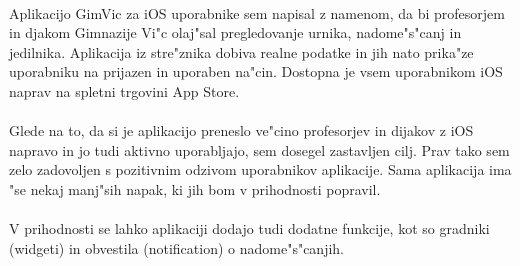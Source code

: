 \paragraph{}Aplikacijo GimVic za iOS uporabnike sem napisal z namenom, da bi profesorjem in djakom Gimnazije Vi"c olaj"sal pregledovanje urnika, nadome"s"canj in jedilnika. Aplikacija iz stre"znika dobiva realne podatke in jih nato prika"ze uporabniku na prijazen in uporaben na"cin. Dostopna je vsem uporabnikom iOS naprav na spletni trgovini App Store.

\paragraph{}Glede na to, da si je aplikacijo preneslo ve"cino profesorjev in dijakov z iOS napravo in jo tudi aktivno uporabljajo, sem dosegel zastavljen cilj. Prav tako sem zelo zadovoljen s pozitivnim odzivom uporabnikov aplikacije. Sama aplikacija ima "se nekaj manj"sih napak, ki jih bom v prihodnosti popravil.

\paragraph{}
V prihodnosti se lahko aplikaciji dodajo tudi dodatne funkcije, kot so gradniki (widgeti) in obvestila (notification) o nadome"s"canjih.
